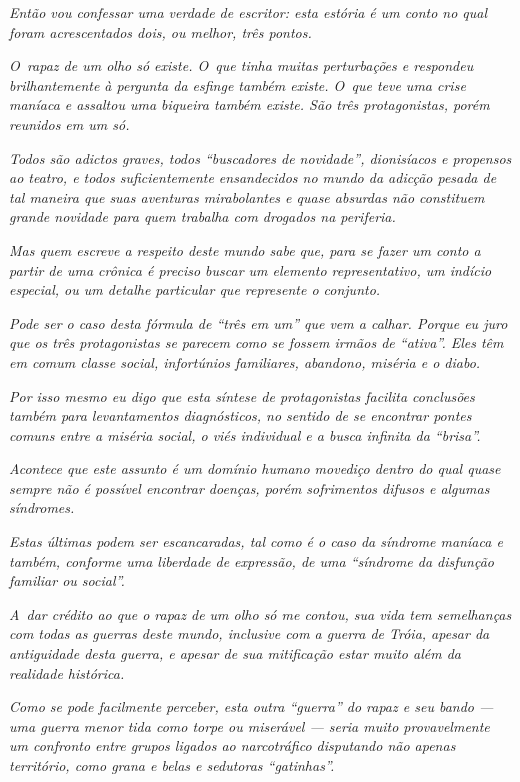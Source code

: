 \emph{Então vou confessar uma verdade de escritor: esta estória é um
conto no qual foram acrescentados dois, ou melhor, três pontos.}~

\emph{O~rapaz de um olho só existe. O~que tinha muitas perturbações e
respondeu brilhantemente à pergunta da esfinge também existe. O~que teve
uma crise maníaca e assaltou uma biqueira também existe. São três
protagonistas, porém reunidos em um só.}~

\emph{Todos são adictos graves, todos ``buscadores de novidade'',
dionisíacos e propensos ao teatro, e todos suficientemente ensandecidos
no mundo da adicção pesada de tal maneira que suas aventuras
mirabolantes e quase absurdas não constituem grande novidade para quem
trabalha com drogados na periferia.}~

\emph{Mas quem escreve a respeito deste mundo sabe que, para se fazer um
conto a partir de uma crônica é preciso buscar um elemento
representativo, um indício especial, ou um detalhe particular que
represente o conjunto.}~

\emph{Pode ser o caso desta fórmula de ``três em um'' que vem a calhar.
Porque eu juro que os três protagonistas se parecem como se fossem
irmãos de ``ativa''. Eles têm em comum classe social, infortúnios
familiares, abandono, miséria e o diabo.}~

\emph{Por isso mesmo eu digo que esta síntese de protagonistas facilita
conclusões também para levantamentos diagnósticos, no sentido de se
encontrar pontes comuns entre a miséria social, o viés individual e a
busca infinita da ``brisa''.}~

\emph{Acontece que este assunto é um domínio humano movediço dentro do
qual quase sempre não é possível encontrar doenças, porém sofrimentos
difusos e algumas síndromes.}~

\emph{Estas últimas podem ser escancaradas, tal como é o caso da
síndrome maníaca e também, conforme uma liberdade de expressão, de uma
``síndrome da disfunção familiar ou social''.}~

\emph{A~dar crédito ao que o rapaz de um olho só me contou, sua vida tem
semelhanças com todas as guerras deste mundo, inclusive com a guerra de
Tróia, apesar da antiguidade desta guerra, e apesar de sua mitificação
estar muito além da realidade histórica.}~

\emph{Como se pode facilmente perceber, esta outra ``guerra'' do rapaz e
seu bando --- uma guerra menor tida como torpe ou miserável --- seria
muito provavelmente um confronto entre grupos ligados ao narcotráfico
disputando não apenas território, como grana e belas e sedutoras
``gatinhas''.}~

